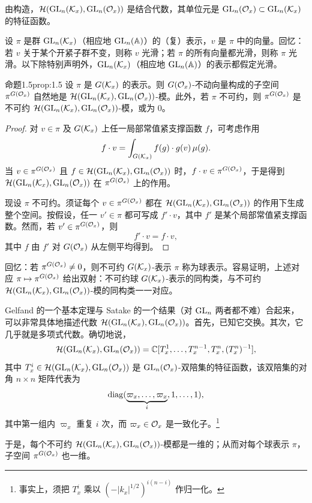 由构造，$\mathcal{H}(\mathrm{GL}_n(\mathcal{K}_x),\mathrm{GL}_n(\mathcal{O}_x))$ 是结合代数，其单位元是 $\mathrm{GL}_n(\mathcal{O}_x)\subset\mathrm{GL}_n(\mathcal{K}_x)$ 的特征函数。

设 $\pi$ 是群 $\mathrm{GL}_n(\mathcal{K}_x)$（相应地 $\mathrm{GL}_n(\mathbb{A})$）的（复）表示，$v$ 是 $\pi$ 中的向量。回忆：若 $v$ 关于某个开紧子群不变，则称 $v$ 光滑；若 $\pi$ 的所有向量都光滑，则称 $\pi$ 光滑。以下除特别声明外，$\mathrm{GL}_n(\mathcal{K}_x)$（相应地 $\mathrm{GL}_n(\mathbb{A})$）的表示都假定光滑。

\begin{othm}{命题}{1.5}{prop:1.5}
设 $\pi$ 是 $G(\mathcal{K}_x)$ 的表示。则 $G(\mathcal{O}_x)$-不动向量构成的子空间 $\pi^{G(\mathcal{O}_x)}$ 自然地是 $\mathcal{H}(\mathrm{GL}_n(\mathcal{K}_x),\mathrm{GL}_n(\mathcal{O}_x))$-模。此外，若 $\pi$ 不可约，则 $\pi^{G(\mathcal{O}_x)}$ 是不可约 $\mathcal{H}(\mathrm{GL}_n(\mathcal{K}_x),\mathrm{GL}_n(\mathcal{O}_x))$-模，或为 $0$。
\end{othm}

\begin{proof}
对 $v\in\pi$ 及 $G(\mathcal{K}_x)$ 上任一局部常值紧支撑函数 $f$，可考虑作用
\[
f\cdot v=\int_{G(\mathcal{K}_x)}f(g)\cdot g(v)\,\mu(g).
\]
当 $v\in\pi^{G(\mathcal{O}_x)}$ 且 $f\in\mathcal{H}(\mathrm{GL}_n(\mathcal{K}_x),\mathrm{GL}_n(\mathcal{O}_x))$ 时，$f\cdot v\in\pi^{G(\mathcal{O}_x)}$，于是得到 $\mathcal{H}(\mathrm{GL}_n(\mathcal{K}_x),\mathrm{GL}_n(\mathcal{O}_x))$ 在 $\pi^{G(\mathcal{O}_x)}$ 上的作用。

现设 $\pi$ 不可约。须证每个 $v\in\pi^{G(\mathcal{O}_x)}$ 都在 $\mathcal{H}(\mathrm{GL}_n(\mathcal{K}_x),\mathrm{GL}_n(\mathcal{O}_x))$ 的作用下生成整个空间。按假设，任一 $v'\in\pi$ 都可写成 $f'\cdot v$，其中 $f'$ 是某个局部常值紧支撑函数。然而，若 $v'\in\pi^{G(\mathcal{O}_x)}$，则
\[
f'\cdot v=f\cdot v,
\]
其中 $f$ 由 $f'$ 对 $G(\mathcal{O}_x)$ 从左侧平均得到。
\end{proof}

回忆：若 $\pi^{G(\mathcal{O}_x)}\neq0$，则不可约 $G(\mathcal{K}_x)$-表示 $\pi$ 称为球表示。容易证明，上述对应 $\pi\mapsto\pi^{G(\mathcal{O}_x)}$ 给出双射：不可约球 $G(\mathcal{K}_x)$-表示的同构类，与不可约 $\mathcal{H}(\mathrm{GL}_n(\mathcal{K}_x),\mathrm{GL}_n(\mathcal{O}_x))$-模的同构类一一对应。

Gelfand 的一个基本定理与 Satake 的一个结果（对 $\mathrm{GL}_n$ 两者都不难）合起来，可以非常具体地描述代数 $\mathcal{H}(\mathrm{GL}_n(\mathcal{K}_x),\mathrm{GL}_n(\mathcal{O}_x))$。首先，已知它交换。其次，它几乎就是多项式代数。确切地说，
\[
\mathcal{H}(\mathrm{GL}_n(\mathcal{K}_x),\mathrm{GL}_n(\mathcal{O}_x))=\mathbb{C}[T_x^1,\dots,T_x^{n-1},T_x^n,(T_x^n)^{-1}],
\]
其中 $T_x^i\in\mathcal{H}(\mathrm{GL}_n(\mathcal{K}_x),\mathrm{GL}_n(\mathcal{O}_x))$ 是 $\mathrm{GL}_n(\mathcal{O}_x)$-双陪集的特征函数，该双陪集的对角 $n\times n$ 矩阵代表为
\[
\operatorname{diag}(\underbrace{\varpi_x,\dots,\varpi_x}_{i},1,\dots,1),
\]
其中第一组内 $\varpi_x$ 重复 $i$ 次，而 $\varpi_x\in\mathcal{O}_x$ 是一致化子。\footnote{事实上，须把 $T_x^i$ 乘以 $(-|k_x|^{1/2})^{i(n-i)}$ 作归一化。}

于是，每个不可约 $\mathcal{H}(\mathrm{GL}_n(\mathcal{K}_x),\mathrm{GL}_n(\mathcal{O}_x))$-模都是一维的；从而对每个球表示 $\pi$，子空间 $\pi^{G(\mathcal{O}_x)}$ 也一维。

